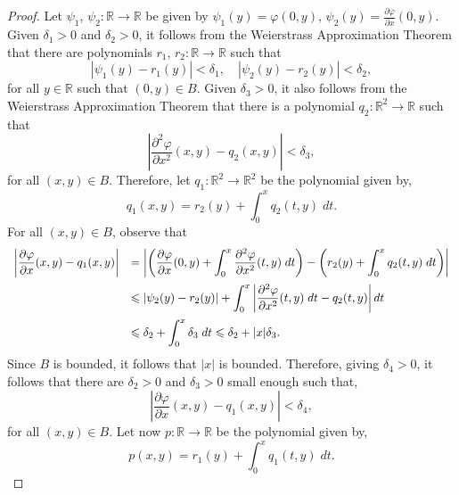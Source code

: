 \documentclass[11pt]{amsart}
\begin{document}
\begin{proof} Let $\psi_1$, $\psi_2\colon\mathbb{R}\to\mathbb{R}$ be given by $\psi_1(y)=\varphi(0,y)$, $\psi_2(y)=\frac{\partial\varphi}{\partial x}(0,y)$. Given $\delta_1>0$ and $\delta_2>0$, it follows from the Weierstrass Approximation Theorem that there are polynomials $r_1$, $r_2\colon\mathbb{R}\to\mathbb{R}$ such that
	\[|\psi_1(y)-r_1(y)|<\delta_1, \quad |\psi_2(y)-r_2(y)|<\delta_2,\]
for all $y\in\mathbb{R}$ such that $(0,y)\in B$. Given $\delta_3>0$, it also follows from the Weierstrass Approximation Theorem that there is a polynomial $q_2\colon\mathbb{R}^2\to\mathbb{R}$ such that
\begin{equation}\label{10}
	\left|\frac{\partial^2\varphi}{\partial x^2}(x,y)-q_2(x,y)\right|<\delta_3,
\end{equation}
for all $(x,y)\in B$. Therefore, let $q_1\colon\mathbb{R}^2\to\mathbb{R}^2$ be the polynomial given by,
\begin{equation}\label{2}
	q_1(x,y)=r_2(y)+\int_{0}^{x}q_2(t,y)\;dt.
\end{equation}
For all $(x,y)\in B$, observe that
\begin{equation}\label{11}
	\begin{array}{rl}
		\displaystyle \left|\frac{\partial\varphi}{\partial x}(x,y)-q_1(x,y)\right| &\displaystyle= \left|\left(\frac{\partial\varphi}{\partial x}(0,y)+\int_{0}^{x}\frac{\partial^2\varphi}{\partial x^2}(t,y)\;dt\right)-\left(r_2(y)+\int_{0}^{x}q_2(t,y)\;dt\right)\right| \vspace{0.2cm} \\
		&\displaystyle\leqslant |\psi_2(y)-r_2(y)|+\int_{0}^{x}\left|\frac{\partial^2\varphi}{\partial x^2}(t,y)\;dt-q_2(t,y)\right|dt \vspace{0.2cm} \\
		&\displaystyle\leqslant \delta_2+\int_{0}^{x}\delta_3\;dt \leqslant\delta_2+|x|\delta_3.
	\end{array}
\end{equation}
Since $B$ is bounded, it follows that $|x|$ is bounded. Therefore, giving $\delta_4>0$, it follows that there are $\delta_2>0$ and $\delta_3>0$ small enough such that,
\begin{equation}\label{9}
	\left|\frac{\partial\varphi}{\partial x}(x,y)-q_1(x,y)\right|<\delta_4,
\end{equation}
for all $(x,y)\in B$. Let now $p\colon\mathbb{R}\to\mathbb{R}$ be the polynomial given by,
\begin{equation}\label{13}
	p(x,y)=r_1(y)+\int_{0}^{x}q_1(t,y)\;dt.

\end{equation}
\end{proof}
\end{document}
